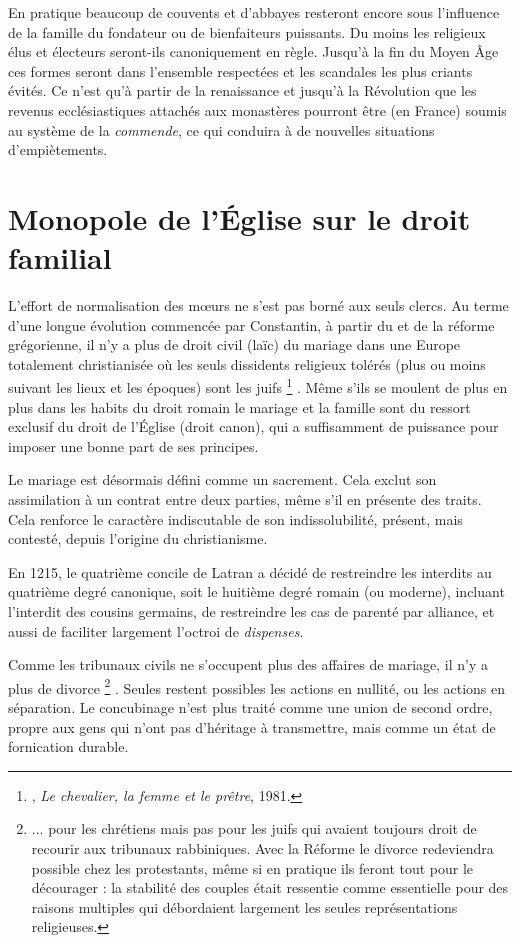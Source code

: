 En pratique beaucoup de couvents et d'abbayes resteront encore sous l'influence de la famille du fondateur ou de bienfaiteurs puissants. Du moins les religieux élus et électeurs seront-ils canoniquement en règle. Jusqu'à la fin du Moyen Âge ces formes seront dans l'ensemble respectées et les scandales les plus criants évités. Ce n'est qu'à partir de la renaissance et jusqu'à la Révolution que les revenus ecclésiastiques attachés aux monastères pourront être (en France) soumis au système de la \emph{commende}, ce qui conduira à de nouvelles situations d'empiètements.

\section{Monopole de l'Église sur le droit familial}

 L'effort de normalisation des mœurs ne s'est pas borné aux seuls clercs. Au terme d'une longue évolution commencée par Constantin, à partir du  et de la réforme grégorienne, il n'y a plus de droit civil (laïc) du mariage dans une Europe totalement christianisée où les seuls dissidents religieux tolérés (plus ou moins suivant les lieux et les époques) sont les juifs%
\footnote{, \emph{Le chevalier, la femme et le prêtre}, 1981.}%
. Même s'ils se moulent de plus en plus dans les habits du droit romain le mariage et la famille sont du ressort exclusif du droit de l'Église (droit canon), qui a suffisamment de puissance pour imposer une bonne part de ses principes. 

 Le mariage est désormais défini comme un sacrement. Cela exclut son assimilation à un contrat entre deux parties, même s'il en présente des traits. Cela renforce le caractère indiscutable de son indissolubilité, présent, mais contesté, depuis l'origine du christianisme. 

 En 1215, le quatrième concile de Latran a décidé de restreindre les interdits au quatrième degré canonique, soit le huitième degré romain (ou moderne), incluant l'interdit des cousins germains, de restreindre les cas de parenté par alliance, et aussi de faciliter largement l'octroi de \emph{dispenses}.

 Comme les tribunaux civils ne s'occupent plus des affaires de mariage, il n'y a plus de divorce%
\footnote{... pour les chrétiens mais pas pour les juifs qui avaient toujours droit de recourir aux tribunaux rabbiniques. Avec la Réforme le divorce redeviendra possible chez les protestants, même si en pratique ils feront tout pour le décourager : la stabilité des couples était ressentie comme essentielle pour des raisons multiples qui débordaient largement les seules représentations religieuses.}%
. Seules restent possibles les actions en nullité, ou les actions en séparation. Le concubinage n'est plus traité comme une union de second ordre, propre aux gens qui n'ont pas d'héritage à transmettre, mais comme un état de fornication durable.

